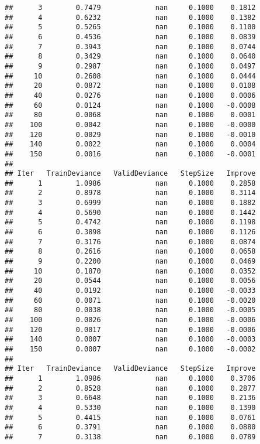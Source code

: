 \documentclass[
]{article}
\begin{document}
\begin{verbatim}
##      3        0.7479             nan     0.1000    0.1812
##      4        0.6232             nan     0.1000    0.1382
##      5        0.5265             nan     0.1000    0.1100
##      6        0.4536             nan     0.1000    0.0839
##      7        0.3943             nan     0.1000    0.0744
##      8        0.3429             nan     0.1000    0.0640
##      9        0.2987             nan     0.1000    0.0497
##     10        0.2608             nan     0.1000    0.0444
##     20        0.0872             nan     0.1000    0.0108
##     40        0.0276             nan     0.1000    0.0006
##     60        0.0124             nan     0.1000   -0.0008
##     80        0.0068             nan     0.1000    0.0001
##    100        0.0042             nan     0.1000   -0.0000
##    120        0.0029             nan     0.1000   -0.0010
##    140        0.0022             nan     0.1000    0.0004
##    150        0.0016             nan     0.1000   -0.0001
## 
## Iter   TrainDeviance   ValidDeviance   StepSize   Improve
##      1        1.0986             nan     0.1000    0.2858
##      2        0.8978             nan     0.1000    0.3114
##      3        0.6999             nan     0.1000    0.1882
##      4        0.5690             nan     0.1000    0.1442
##      5        0.4742             nan     0.1000    0.1198
##      6        0.3898             nan     0.1000    0.1126
##      7        0.3176             nan     0.1000    0.0874
##      8        0.2616             nan     0.1000    0.0658
##      9        0.2200             nan     0.1000    0.0469
##     10        0.1870             nan     0.1000    0.0352
##     20        0.0544             nan     0.1000    0.0056
##     40        0.0192             nan     0.1000   -0.0033
##     60        0.0071             nan     0.1000   -0.0020
##     80        0.0038             nan     0.1000   -0.0005
##    100        0.0026             nan     0.1000   -0.0006
##    120        0.0017             nan     0.1000   -0.0006
##    140        0.0007             nan     0.1000   -0.0003
##    150        0.0007             nan     0.1000   -0.0002
## 
## Iter   TrainDeviance   ValidDeviance   StepSize   Improve
##      1        1.0986             nan     0.1000    0.3706
##      2        0.8528             nan     0.1000    0.2877
##      3        0.6648             nan     0.1000    0.2136
##      4        0.5330             nan     0.1000    0.1390
##      5        0.4415             nan     0.1000    0.0761
##      6        0.3791             nan     0.1000    0.0880
##      7        0.3138             nan     0.1000    0.0789

\end{verbatim}
\end{document}
